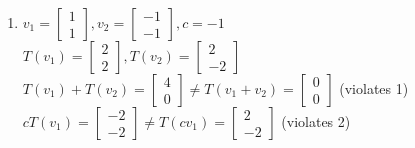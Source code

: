 \documentclass[12pt]{amsart}
\begin{document}
\begin{enumerate}
{\begin{enumerate}
    \item $v_1=\left[\begin{matrix} 1 \\ 1\end{matrix}\right],v_2=\left[\begin{matrix} -1 \\ -1\end{matrix}\right],c=-1$\\
          $T(v_1)=\left[\begin{matrix} 2 \\ 2 \end{matrix}\right],T(v_2)=\left[\begin{matrix} 2 \\ -2\end{matrix}\right]$\\
          $T(v_1)+T(v_2)=\left[\begin{matrix} 4 \\ 0\end{matrix}\right]\ne T(v_1+v_2)=\left[\begin{matrix} 0 \\ 0 \end{matrix}\right]$ (violates 1)\\
          $cT(v_1)=\left[\begin{matrix} -2 \\ -2\end{matrix}\right]\ne T(cv_1)=\left[\begin{matrix} 2 \\ -2 \end{matrix}\right]$ (violates 2)

  \end{enumerate}
}


\end{enumerate}
\end{document}
